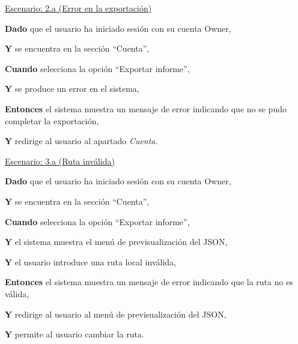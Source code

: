 \underline{Escenario: 2.a (Error en la exportación)}\par
\vspace{0.15cm}
\textbf{Dado} que el usuario ha iniciado sesión con su cuenta Owner,\par
\textbf{Y} se encuentra en la sección \enquote{Cuenta},\par
\textbf{Cuando} selecciona la opción \enquote{Exportar informe},\par
\textbf{Y} se produce un error en el sistema,\par
\textbf{Entonces} el sistema muestra un mensaje de error indicando que no se pudo completar la exportación,\par
\textbf{Y} redirige al usuario al apartado \textit{Cuenta}.\par
\vspace{0.20cm}

\underline{Escenario: 3.a (Ruta inválida)}\par
\vspace{0.15cm}
\textbf{Dado} que el usuario ha iniciado sesión con su cuenta Owner,\par
\textbf{Y} se encuentra en la sección \enquote{Cuenta},\par
\textbf{Cuando} selecciona la opción \enquote{Exportar informe},\par
\textbf{Y} el sistema muestra el menú de previsualización del JSON,\par
\textbf{Y} el usuario introduce una ruta local inválida,\par
\textbf{Entonces} el sistema muestra un mensaje de error indicando que la ruta no es válida,\par
\textbf{Y} redirige al usuario al menú de previsualización del JSON,\par
\textbf{Y} permite al usuario cambiar la ruta.\par
\vspace{0.20cm}

\newpage %


